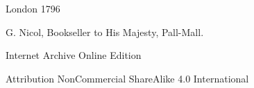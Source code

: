 \documentclass[a4paper, 12pt, oneside, twocolumn]{article}
\begin{document}
\begin{titlepage}
\pagestyle{fancy}	%
	
		
	\vspace*{\fill}%
	
	London 1796 %
	
	{\small G. Nicol, Bookseller to His Majesty, Pall-Mall. } %

	\vspace{1\baselineskip} %

    Internet Archive Online Edition  %
	
	{\small Attribution NonCommercial ShareAlike 4.0 International } %
\end{titlepage}
\end{document}
